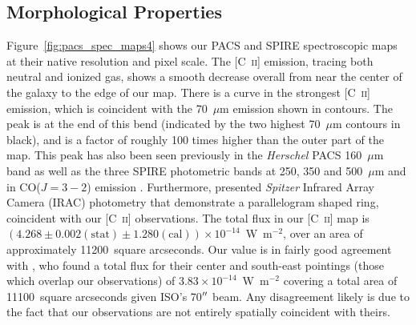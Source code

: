 \subsection{Morphological Properties}\label{properties}
Figure~\ref{fig:pacs_spec_maps4} shows our PACS and SPIRE spectroscopic maps at their native resolution and pixel scale.  The [C~\textsc{ii}] emission, tracing both neutral and ionized gas, shows a smooth decrease overall from near the center of the galaxy to the edge of our map.  There is a curve in the strongest [C~\textsc{ii}] emission, which is coincident with the 70~$\mu$m emission shown in contours.  The peak is at the end of this bend (indicated by the two highest 70~$\mu$m contours in black), and is a factor of roughly 100 times higher than the outer part of the map.  This peak has also been seen previously in the \emph{Herschel} PACS 160~$\mu$m band as well as the three SPIRE photometric bands at 250, 350 and 500~$\mu$m and in CO($J=3-2$) emission \citep{2012MNRAS.422.2291P}.  Furthermore, \citet{2006ApJ...645.1092Q} presented \emph{Spitzer} Infrared Array Camera (IRAC) photometry that demonstrate a parallelogram shaped ring, coincident with our [C~\textsc{ii}] observations.  The total flux in our [C~\textsc{ii}] map is $(4.268 \pm 0.002 (\mathrm{stat}) \pm 1.280 (\mathrm{cal})) \times 10^{-14}$~W~m$^{-2}$, over an area of approximately 11200~square arcseconds.  Our value is in fairly good agreement with \citet{2000A&A...355..885U}, who found a total flux for their center and south-east pointings (those which overlap our observations) of $3.83 \times 10^{-14}$~W~m$^{-2}$ covering a total area of 11100~square arcseconds given ISO's 70$\mbox{$^{\prime\prime}$}$ beam.  Any disagreement likely is due to the fact that our observations are not entirely spatially coincident with theirs.

